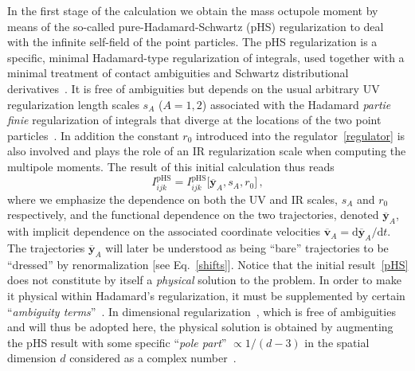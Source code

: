 \documentclass[prd,preprint,superscriptaddress,tightenlines,nofootinbib,
  eqsecnum,showpacs]{revtex4}
\newcommand{\ud}{\mathrm{d}}
\begin{document}
In the first stage of the calculation we obtain the mass octupole
moment by means of the so-called pure-Hadamard-Schwartz (pHS)
regularization to deal with the infinite self-field of the point
particles. The pHS regularization is a specific, minimal Hadamard-type
regularization of integrals, used together with a minimal treatment of
contact ambiguities and Schwartz distributional
derivatives~\cite{BDE04}. It is free of ambiguities but depends on the
usual arbitrary UV regularization length scales $s_A$ ($A=1,2$)
associated with the Hadamard \textit{partie finie} regularization of
integrals that diverge at the locations of the two point
particles~\cite{BFreg}. In addition the constant $r_0$ introduced into
the regulator~\eqref{regulator} is also involved and plays the role of
an IR regularization scale when computing the multipole moments. The
result of this initial calculation thus reads
%
\begin{equation}\label{pHS}
I_{ijk}^\text{pHS} = I_{ijk}^\text{pHS} \bigl[\overline{\bm{y}}_A,
  s_A, r_0\bigr]\,,
\end{equation}
%
where we emphasize the dependence on both the UV and IR scales, $s_A$
and $r_0$ respectively, and the functional dependence on the two
trajectories, denoted $\overline{\bm{y}}_A$, with implicit dependence
on the associated coordinate velocities $\overline{\bm{v}}_A =
\ud\overline{\bm{y}}_A/\ud t$.  The trajectories $\overline{\bm{y}}_A$
will later be understood as being ``bare'' trajectories to be
``dressed'' by renormalization [see Eq.~\eqref{shifts}]. Notice that
the initial result~\eqref{pHS} does not constitute by itself a
\textit{physical} solution to the problem. In order to make it
physical within Hadamard's regularization, it must be supplemented by
certain ``\textit{ambiguity terms}''~\cite{BIJ02, BI04mult}. In
dimensional regularization~\cite{Bollini, tHooft}, which is free of
ambiguities and will thus be adopted here, the physical solution is
obtained by augmenting the pHS result with some specific
``\textit{pole part}'' $\propto 1/(d-3)$ in the spatial dimension $d$
considered as a complex number~\cite{BDE04, BDEI04, BDEI05dr}.
\end{document}
